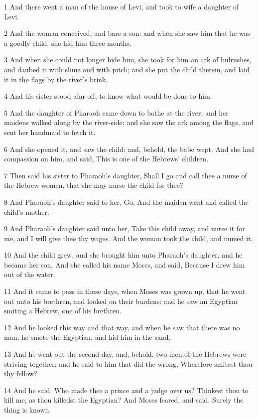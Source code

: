 \par 1 And there went a man of the house of Levi, and took to wife a daughter of Levi.
\par 2 And the woman conceived, and bare a son: and when she saw him that he was a goodly child, she hid him three months.
\par 3 And when she could not longer hide him, she took for him an ark of bulrushes, and daubed it with slime and with pitch; and she put the child therein, and laid it in the flags by the river's brink.
\par 4 And his sister stood afar off, to know what would be done to him.
\par 5 And the daughter of Pharaoh came down to bathe at the river; and her maidens walked along by the river-side; and she saw the ark among the flags, and sent her handmaid to fetch it.
\par 6 And she opened it, and saw the child: and, behold, the babe wept. And she had compassion on him, and said, This is one of the Hebrews' children.
\par 7 Then said his sister to Pharaoh's daughter, Shall I go and call thee a nurse of the Hebrew women, that she may nurse the child for thee?
\par 8 And Pharaoh's daughter said to her, Go. And the maiden went and called the child's mother.
\par 9 And Pharaoh's daughter said unto her, Take this child away, and nurse it for me, and I will give thee thy wages. And the woman took the child, and nursed it.
\par 10 And the child grew, and she brought him unto Pharaoh's daughter, and he became her son. And she called his name Moses, and said, Because I drew him out of the water.
\par 11 And it came to pass in those days, when Moses was grown up, that he went out unto his brethren, and looked on their burdens: and he saw an Egyptian smiting a Hebrew, one of his brethren.
\par 12 And he looked this way and that way, and when he saw that there was no man, he smote the Egyptian, and hid him in the sand.
\par 13 And he went out the second day, and, behold, two men of the Hebrews were striving together: and he said to him that did the wrong, Wherefore smitest thou thy fellow?
\par 14 And he said, Who made thee a prince and a judge over us? Thinkest thou to kill me, as thou killedst the Egyptian? And Moses feared, and said, Surely the thing is known.
